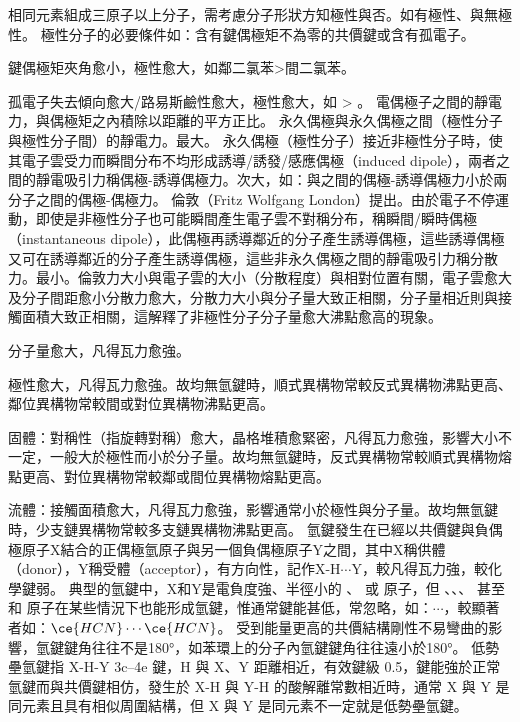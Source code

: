 \documentclass[a4paper,12pt]{report}
\begin{document}
相同元素組成三原子以上分子，需考慮分子形狀方知極性與否。如有極性、與無極性。
極性分子的必要條件如：含有鍵偶極矩不為零的共價鍵或含有孤電子。
\bit
\item 鍵偶極矩夾角愈小，極性愈大，如鄰二氯苯>間二氯苯。
\item 孤電子失去傾向愈大/路易斯鹼性愈大，極性愈大，如 > 。
\eit
{}
電偶極子之間的靜電力，與偶極矩之內積除以距離的平方正比。
永久偶極與永久偶極之間（極性分子與極性分子間）的靜電力。最大。
永久偶極（極性分子）接近非極性分子時，使其電子雲受力而瞬間分布不均形成誘導/誘發/感應偶極（induced dipole），兩者之間的靜電吸引力稱偶極-誘導偶極力。次大，如：與之間的偶極-誘導偶極力小於兩分子之間的偶極-偶極力。
倫敦（Fritz Wolfgang London）提出。由於電子不停運動，即使是非極性分子也可能瞬間產生電子雲不對稱分布，稱瞬間/瞬時偶極（instantaneous dipole），此偶極再誘導鄰近的分子產生誘導偶極，這些誘導偶極又可在誘導鄰近的分子產生誘導偶極，這些非永久偶極之間的靜電吸引力稱分散力。最小。倫敦力大小與電子雲的大小（分散程度）與相對位置有關，電子雲愈大及分子間距愈小分散力愈大，分散力大小與分子量大致正相關，分子量相近則與接觸面積大致正相關，這解釋了非極性分子分子量愈大沸點愈高的現象。
\bit
\item 分子量愈大，凡得瓦力愈強。
\item 極性愈大，凡得瓦力愈強。故均無氫鍵時，順式異構物常較反式異構物沸點更高、鄰位異構物常較間或對位異構物沸點更高。
\item 固體：對稱性（指旋轉對稱）愈大，晶格堆積愈緊密，凡得瓦力愈強，影響大小不一定，一般大於極性而小於分子量。故均無氫鍵時，反式異構物常較順式異構物熔點更高、對位異構物常較鄰或間位異構物熔點更高。
\item 流體：接觸面積愈大，凡得瓦力愈強，影響通常小於極性與分子量。故均無氫鍵時，少支鏈異構物常較多支鏈異構物沸點更高。
\eit
{}
氫鍵發生在已經以共價鍵與負偶極原子X結合的正偶極氫原子與另一個負偶極原子Y之間，其中X稱供體（donor），Y稱受體（acceptor），有方向性，記作X-H$\cdots$Y，較凡得瓦力強，較化學鍵弱。
典型的氫鍵中，X和Y是電負度強、半徑小的 、 或  原子，但 、、、 甚至  和  原子在某些情況下也能形成氫鍵，惟通常鍵能甚低，常忽略，如：$\cdots$，較顯著者如：$\ce{HCN}\cdots\ce{HCN}$。
受到能量更高的共價結構剛性不易彎曲的影響，氫鍵鍵角往往不是180°，如苯環上的分子內氫鍵鍵角往往遠小於180°。
低勢壘氫鍵指 X-H-Y 3c–4e 鍵，H 與 X、Y 距離相近，有效鍵級 0.5，鍵能強於正常氫鍵而與共價鍵相仿，發生於 X-H 與 Y-H 的酸解離常數相近時，通常 X 與 Y 是同元素且具有相似周圍結構，但 X 與 Y 是同元素不一定就是低勢壘氫鍵。
\end{document}
